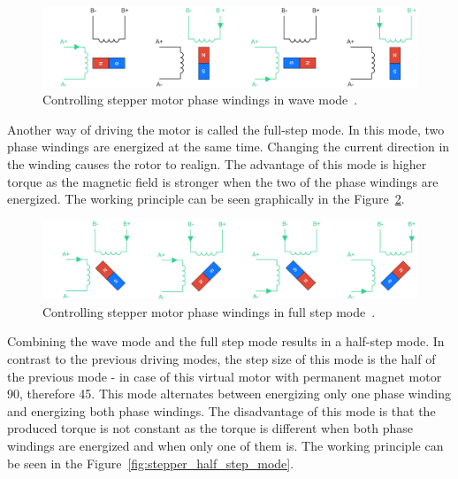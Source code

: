 \begin{figure}[H]
    \centering
    \includegraphics[width=\textwidth]{obrazky/wave_principle}
    \caption{Controlling stepper motor phase windings in wave mode~\cite{noauthor_stepper_nodate}.}
    \label{fig:stepper_wave_mode}
\end{figure}

\newpage
Another way of driving the motor is called the full-step mode.
In this mode, two phase windings are energized at the same time.
Changing the current direction in the winding causes the rotor to realign.
The advantage of this mode is higher torque as the magnetic field is stronger when the two of the phase windings are energized.
The working principle can be seen graphically in the Figure~\ref{fig:stepper_full_step_mode}.

\begin{figure}[H]
    \centering
    \includegraphics[width=\textwidth]{obrazky/full_step_principle}
    \caption{Controlling stepper motor phase windings in full step mode~\cite{noauthor_stepper_nodate}.}
    \label{fig:stepper_full_step_mode}
\end{figure}

Combining the wave mode and the full step mode results in a half-step mode.
In contrast to the previous driving modes, the step size of this mode is the half of the previous mode - in case of this virtual motor with permanent magnet motor 90\textdegree, therefore 45\textdegree.
This mode alternates between energizing only one phase winding and energizing both phase windings.
The disadvantage of this mode is that the produced torque is not constant as the torque is different when both phase windings are energized and when only one of them is.
The working principle can be seen in the Figure~\ref{fig:stepper_half_step_mode}.

